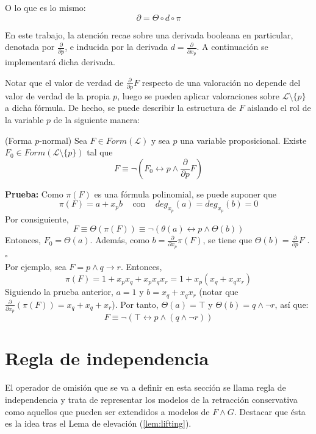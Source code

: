 \noindent O lo que es lo mismo: $$\partial = \Theta \circ d \circ \pi $$
 
 En este trabajo, la atención recae sobre una derivada booleana en particular, denotada por $\frac{\partial}{\partial p}$, e inducida por la derivada $d = \frac{\partial}{\partial x_p}$. A continuación se implementará dicha derivada.\\

 
Notar que el valor de verdad de $\frac{\partial}{\partial p}F$ respecto de una valoración no depende del valor de verdad de la propia $p$, luego se pueden aplicar valoraciones sobre $\mathcal{L} \setminus \{ p \}$ a dicha fórmula. De hecho, se puede describir la estructura de $F$ aislando el rol de la variable $p$ de la siguiente manera:

\lem \cite{Borrego2009} (Forma $p$-normal) Sea $F \in Form(\mathcal{L})$ y sea $p$ una variable proposicional. Existe $F_0 \in Form (\mathcal{L} \setminus \{ p \})$ tal que 
$$F \equiv \neg (F_0 \leftrightarrow p \wedge \frac{\partial}{\partial p} F)$$

\noindent \textbf{Prueba:} Como $\pi (F)$ es una fórmula polinomial, se puede suponer que
$$\pi (F) = a + x_p b \;\;\; \text{ con } \;\;\; deg_{x_p} (a) = deg_{x_p} (b) = 0$$
\noindent Por consiguiente,
$$F \equiv \Theta (\pi (F)) \equiv \neg (\theta (a) \leftrightarrow p \wedge \Theta (b)) $$
Entonces, $F_0 = \Theta (a)$. Además, como $b=\frac{\partial}{\partial x_p} \pi (F)$, se tiene que $\Theta (b) = \frac{\partial}{\partial p} F$ . \hspace{1cm} $\square$ \\

Por ejemplo, sea $F=p \wedge q \rightarrow r$. Entonces,
$$\pi (F) = 1+x_px_q + x_px_qx_r = 1+x_p (x_q+x_qx_r)$$
Siguiendo la prueba anterior, $a=1$ y $b=x_q+x_qx_r$ (notar que $\frac{\partial}{\partial x_p} (\pi (F))=x_q+x_q+x_r$). Por tanto, $\Theta (a) = \top$ y $\Theta (b)=q \wedge \neg r$, así que:
$$F \equiv \neg (\top \leftrightarrow p \wedge (q \wedge \neg r))$$


\section{Regla de independencia}
El operador de omisión que se va a definir en esta sección se llama regla de independencia y trata de representar los modelos de la retracción conservativa como aquellos que pueden ser extendidos a modelos de $F \wedge G$. Destacar que ésta es la idea tras el Lema de elevación (\ref{lem:lifting}).\\

